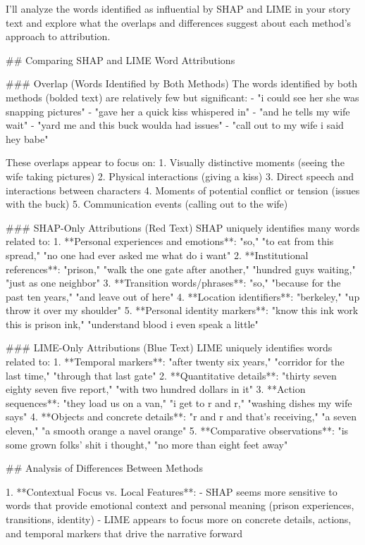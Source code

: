 I'll analyze the words identified as influential by SHAP and LIME in your story text and explore what the overlaps and differences suggest about each method's approach to attribution.

## Comparing SHAP and LIME Word Attributions

### Overlap (Words Identified by Both Methods)
The words identified by both methods (bolded text) are relatively few but significant:
- "i could see her she was snapping pictures"
- "gave her a quick kiss whispered in"
- "and he tells my wife wait"
- "yard me and this buck woulda had issues"
- "call out to my wife i said hey babe"

These overlaps appear to focus on:
1. Visually distinctive moments (seeing the wife taking pictures)
2. Physical interactions (giving a kiss)
3. Direct speech and interactions between characters
4. Moments of potential conflict or tension (issues with the buck)
5. Communication events (calling out to the wife)

### SHAP-Only Attributions (Red Text)
SHAP uniquely identifies many words related to:
1. **Personal experiences and emotions**: "so," "to eat from this spread," "no one had ever asked me what do i want"
2. **Institutional references**: "prison," "walk the one gate after another," "hundred guys waiting," "just as one neighbor"
3. **Transition words/phrases**: "so," "because for the past ten years," "and leave out of here"
4. **Location identifiers**: "berkeley," "up throw it over my shoulder"
5. **Personal identity markers**: "know this ink work this is prison ink," "understand blood i even speak a little"

### LIME-Only Attributions (Blue Text)
LIME uniquely identifies words related to:
1. **Temporal markers**: "after twenty six years," "corridor for the last time," "through that last gate"
2. **Quantitative details**: "thirty seven eighty seven five report," "with two hundred dollars in it"
3. **Action sequences**: "they load us on a van," "i get to r and r," "washing dishes my wife says"
4. **Objects and concrete details**: "r and r and that's receiving," "a seven eleven," "a smooth orange a navel orange"
5. **Comparative observations**: "is some grown folks' shit i thought," "no more than eight feet away"

## Analysis of Differences Between Methods

1. **Contextual Focus vs. Local Features**:
   - SHAP seems more sensitive to words that provide emotional context and personal meaning (prison experiences, transitions, identity)
   - LIME appears to focus more on concrete details, actions, and temporal markers that drive the narrative forward

